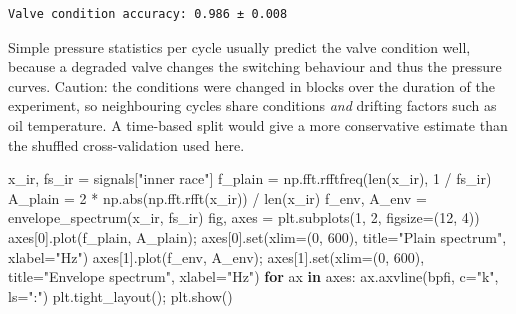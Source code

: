 \documentclass[
  letterpaper,
  DIV=11,
  numbers=noendperiod]{scrreprt}
\newenvironment{Shaded}{\begin{snugshade}}{\end{snugshade}}
\newcommand{\BuiltInTok}[1]{\textcolor[rgb]{0.00,0.23,0.31}{#1}}
\newcommand{\ControlFlowTok}[1]{\textcolor[rgb]{0.00,0.23,0.31}{\textbf{#1}}}
\newcommand{\DecValTok}[1]{\textcolor[rgb]{0.68,0.00,0.00}{#1}}
\newcommand{\KeywordTok}[1]{\textcolor[rgb]{0.00,0.23,0.31}{\textbf{#1}}}
\newcommand{\NormalTok}[1]{\textcolor[rgb]{0.00,0.23,0.31}{#1}}
\newcommand{\OperatorTok}[1]{\textcolor[rgb]{0.37,0.37,0.37}{#1}}
\newcommand{\StringTok}[1]{\textcolor[rgb]{0.13,0.47,0.30}{#1}}
\begin{document}
\begin{tcolorbox}
\begin{verbatim}
Valve condition accuracy: 0.986 ± 0.008
\end{verbatim}

Simple pressure statistics per cycle usually predict the valve condition
well, because a degraded valve changes the switching behaviour and thus
the pressure curves. Caution: the conditions were changed in blocks over
the duration of the experiment, so neighbouring cycles share conditions
\emph{and} drifting factors such as oil temperature. A time-based split
would give a more conservative estimate than the shuffled
cross-validation used here.

\end{tcolorbox}

\begin{tcolorbox}[enhanced jigsaw, left=2mm, title=\textcolor{quarto-callout-caution-color}{\faFire}\hspace{0.5em}{Solution to Exercise 5}, opacityback=0, breakable, rightrule=.15mm, arc=.35mm, toptitle=1mm, colbacktitle=quarto-callout-caution-color!10!white, opacitybacktitle=0.6, coltitle=black, colframe=quarto-callout-caution-color-frame, bottomrule=.15mm, leftrule=.75mm, bottomtitle=1mm, titlerule=0mm, toprule=.15mm, colback=white]

\begin{Shaded}
\begin{Highlighting}[]
\NormalTok{x\_ir, fs\_ir }\OperatorTok{=}\NormalTok{ signals[}\StringTok{"inner race"}\NormalTok{]}
\NormalTok{f\_plain }\OperatorTok{=}\NormalTok{ np.fft.rfftfreq(}\BuiltInTok{len}\NormalTok{(x\_ir), }\DecValTok{1} \OperatorTok{/}\NormalTok{ fs\_ir)}
\NormalTok{A\_plain }\OperatorTok{=} \DecValTok{2} \OperatorTok{*}\NormalTok{ np.}\BuiltInTok{abs}\NormalTok{(np.fft.rfft(x\_ir)) }\OperatorTok{/} \BuiltInTok{len}\NormalTok{(x\_ir)}
\NormalTok{f\_env, A\_env }\OperatorTok{=}\NormalTok{ envelope\_spectrum(x\_ir, fs\_ir)}
\NormalTok{fig, axes }\OperatorTok{=}\NormalTok{ plt.subplots(}\DecValTok{1}\NormalTok{, }\DecValTok{2}\NormalTok{, figsize}\OperatorTok{=}\NormalTok{(}\DecValTok{12}\NormalTok{, }\DecValTok{4}\NormalTok{))}
\NormalTok{axes[}\DecValTok{0}\NormalTok{].plot(f\_plain, A\_plain)}\OperatorTok{;}\NormalTok{ axes[}\DecValTok{0}\NormalTok{].}\BuiltInTok{set}\NormalTok{(xlim}\OperatorTok{=}\NormalTok{(}\DecValTok{0}\NormalTok{, }\DecValTok{600}\NormalTok{), title}\OperatorTok{=}\StringTok{"Plain spectrum"}\NormalTok{, xlabel}\OperatorTok{=}\StringTok{"Hz"}\NormalTok{)}
\NormalTok{axes[}\DecValTok{1}\NormalTok{].plot(f\_env, A\_env)}\OperatorTok{;}\NormalTok{ axes[}\DecValTok{1}\NormalTok{].}\BuiltInTok{set}\NormalTok{(xlim}\OperatorTok{=}\NormalTok{(}\DecValTok{0}\NormalTok{, }\DecValTok{600}\NormalTok{), title}\OperatorTok{=}\StringTok{"Envelope spectrum"}\NormalTok{, xlabel}\OperatorTok{=}\StringTok{"Hz"}\NormalTok{)}
\ControlFlowTok{for}\NormalTok{ ax }\KeywordTok{in}\NormalTok{ axes:}
\NormalTok{    ax.axvline(bpfi, c}\OperatorTok{=}\StringTok{"k"}\NormalTok{, ls}\OperatorTok{=}\StringTok{":"}\NormalTok{)}
\NormalTok{plt.tight\_layout()}\OperatorTok{;}\NormalTok{ plt.show()}


\end{Highlighting}
\end{Shaded}
\end{tcolorbox}
\end{document}
